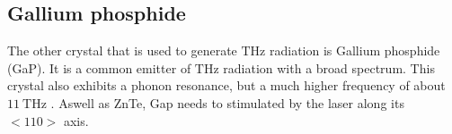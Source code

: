 \subsection{Gallium phosphide}
The other crystal that is used to generate $\si{\tera\hertz}$ radiation is Gallium phosphide (GaP).
It is a common emitter of $\si{\tera\hertz}$ radiation with a broad spectrum.
This crystal also exhibits a phonon resonance, but a much higher frequency of about $\SI{11}{\tera\hertz}$ \cite[60]{wiki_book}.
Aswell as ZnTe, Gap needs to stimulated by the laser along its $<110>$ axis.
